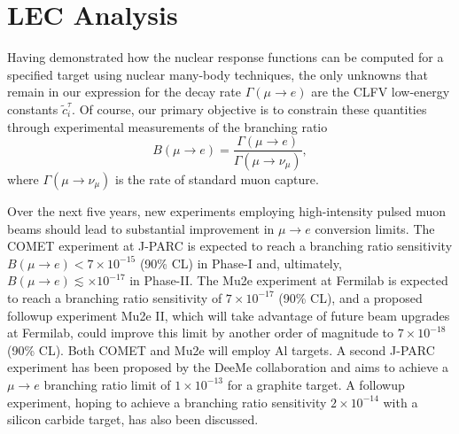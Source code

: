 \documentclass[12pt,letterpaper]{book}
\begin{document}
\chapter{LEC Analysis}
\label{chap:lec_analysis}
\thispagestyle{headings}
Having demonstrated how the nuclear response functions can be computed for a specified target using nuclear many-body techniques, the only unknowns that remain in our expression for the decay rate $\Gamma(\mu\rightarrow e)$ are the CLFV low-energy constants $\tilde{c}_i^{\tau}$. Of course, our primary objective is to constrain these quantities through experimental measurements of the branching ratio 
\begin{equation}
B\left(\mu\rightarrow e\right)=\frac{\Gamma\left(\mu\rightarrow e\right)}{\Gamma\left(\mu\rightarrow \nu_{\mu}\right)},
\end{equation}
where $\Gamma(\mu\rightarrow \nu_{\mu})$ is the rate of standard muon capture. 

Over the next five years, new experiments employing high-intensity pulsed muon beams should lead to substantial improvement in $\mu\rightarrow e$ conversion limits. The COMET experiment at J-PARC is expected to reach a branching ratio sensitivity $B(\mu\rightarrow e)<7\times 10^{-15}$ (90\% CL) in Phase-I and, ultimately, $B(\mu\rightarrow e)\lesssim\times 10^{-17}$ in Phase-II. The Mu2e experiment at Fermilab is expected to reach a branching ratio sensitivity of $7\times 10^{-17}$ (90\% CL), and a proposed followup experiment Mu2e II, which will take advantage of future beam upgrades at Fermilab, could improve this limit by another order of magnitude to $7\times 10^{-18}$ (90\% CL). Both COMET and Mu2e will employ Al targets. A second J-PARC experiment has been proposed by the DeeMe collaboration \cite{Teshima:2019orf} and aims to achieve a $\mu\rightarrow e$ branching ratio limit of $1\times 10^{-13}$ for a graphite target. A followup experiment, hoping to achieve a branching ratio sensitivity $2\times 10^{-14}$ with a silicon carbide target, has also been discussed.
\end{document}
